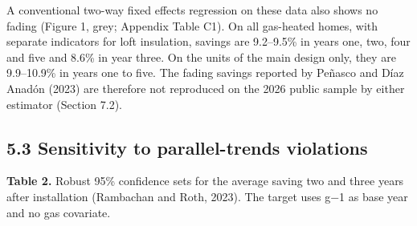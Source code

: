\documentclass[11pt,a4paper]{article}
\begin{document}
A conventional two-way fixed effects regression on these data also shows no fading (Figure 1, grey; Appendix Table C1). On all gas-heated homes, with separate indicators for loft insulation, savings are 9.2--9.5\% in years one, two, four and five and 8.6\% in year three. On the units of the main design only, they are 9.9--10.9\% in years one to five. The fading savings reported by Peñasco and Díaz Anadón (2023) are therefore not reproduced on the 2026 public sample by either estimator (Section 7.2).

\subsection*{5.3 Sensitivity to parallel-trends violations}

\textbf{Table 2.} Robust 95\% confidence sets for the average saving two and three years after installation (Rambachan and Roth, 2023). The target uses g−1 as base year and no gas covariate.
\end{document}
